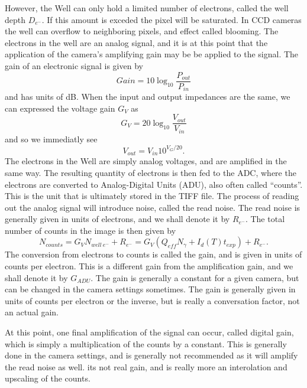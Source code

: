 \documentclass[../../main.tex]{subfiles} %
\begin{document}
However, the Well can only hold a limited number of electrons, called the well depth $D_{e^-}$. If this amount is exceded the pixel will be saturated. In CCD cameras the well can overflow to neighboring pixels, and effect called blooming. The electrons in the well are an analog signal, and it is at this point that the application of the camera's amplifying gain may be be applied to the signal. The gain of an electronic signal is given by 
\begin{equation}
    Gain=10\log_{10}\frac{P_{out}}{P_{in}}
\end{equation}
and has units of dB. When the input and output impedances are the same, we can expressed the voltage gain $G_V$ as 
\begin{equation}
    G_V=20\log_{10}\frac{V_{out}}{V_{in}}
\end{equation}
and so we immediatly see
\begin{equation}
    V_{out}=V_{in}10^{V_{G}/20}.
\end{equation}
The electrons in the Well are simply analog voltages, and are amplified in the same way. The resulting quantity of electrons is then fed to the ADC, where the electrons are converted to Analog-Digital Units (ADU), also often called ``counts''. This is the unit that is ultimately stored in the TIFF file. The process of reading out the analog signal will introduce noise, called the read noise. The read noise is generally given in units of electrons, and we shall denote it by $R_{e^-}$. The total number of counts in the image is then given by
\begin{equation}
    N_{counts}=G_VN_{well\ e^-}+R_{e^-}=G_V(Q_{eff}N_{\gamma}+I_d(T)t_{exp})+R_{e^-}.
\end{equation}
The conversion from electrons to counts is called the gain, and is given in units of counts per electron. This is a different gain from the amplification gain, and we shall denote it by $G_{ADU}$. The gain is generally a constant for a given camera, but can be changed in the camera settings sometimes. The gain is generally given in units of counts per electron or the inverse, but is really a conversation factor, not an actual gain. 

At this point, one final amplification of the signal can occur, called digital gain, which is simply a multiplication of the counts by a constant. This is generally done in the camera settings, and is generally not recommended as it will amplify the read noise as well. its not real gain, and is really more an interolation and upscaling of the counts.
\end{document}

